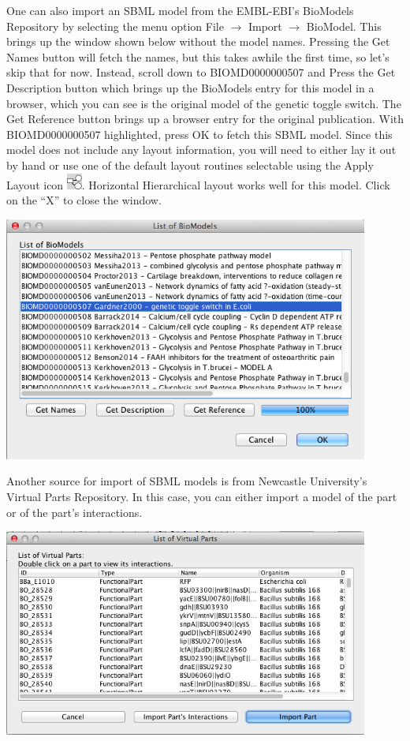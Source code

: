 \documentclass[titlepage,11pt]{article}
\begin{document}
One can also import an SBML model from the EMBL-EBI's BioModels Repository by selecting the menu option File $\rightarrow$ Import $\rightarrow$ BioModel.  This brings up the window shown below without the model names.  Pressing the Get Names button will fetch the names, but this takes awhile the first time, so let's skip that for now.  Instead, scroll down to BIOMD0000000507 and Press the Get Description button which brings up the BioModels entry for this model in a browser, which you can see is the original model of the genetic toggle switch.  The Get Reference button brings up a browser entry for the original publication.  With BIOMD0000000507 highlighted, press OK to fetch this SBML model.  Since this model does not include any layout information, you will need to either lay it out by hand or use one of the default layout routines selectable using the Apply Layout icon \includegraphics{../gui/icons/modelview/choose_layout_selected}.  Horizontal Hierarchical layout works well for this model.  Click on the ``X'' to close the window.

\begin{center}
\includegraphics[width=120mm]{screenshots/BioModels}
\end{center}

Another source for import of SBML models is from Newcastle University's Virtual Parts Repository.  In this case, you can either import a model of the part or of the part's interactions.  

\begin{center}
\includegraphics[width=120mm]{screenshots/VirtualParts}
\end{center}
\end{document}
